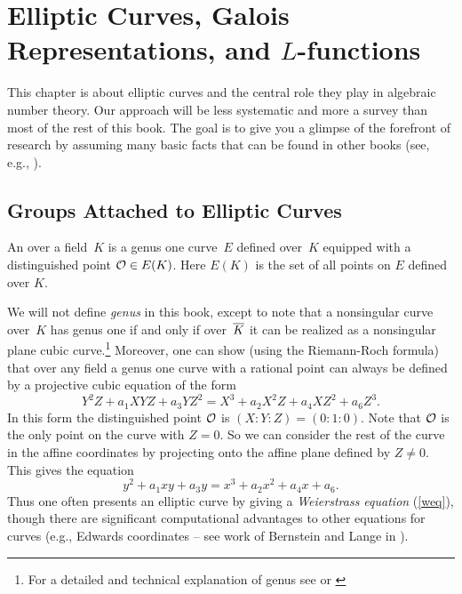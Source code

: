 \chapter[Elliptic Curves and $L$-functions]{Elliptic Curves, Galois Representations, and $L$-functions}

This chapter is about elliptic curves and the central role they play
in algebraic number theory.  Our approach will be less systematic and
more a survey than most of the rest of this book.  The goal is to
give you a glimpse of the forefront of research by assuming many basic
facts that can be found in other books (see, e.g.,
\cite{silverman:aec}).

\section{Groups Attached to Elliptic Curves}


\begin{definition}\label{defn:ec}
  An  over a field~$K$ is a genus one curve~$E$
  defined over~$K$ equipped with a distinguished point $\mathcal{O} \in E(K)$.
  Here $E(K)$ is the set of all points on $E$ defined over $K$.
\end{definition}
We will not define \emph{genus} in this book, except to note that a
nonsingular curve over~$K$ has genus one if and only if over~$\overline{K}$
it can be realized as a nonsingular plane cubic curve.\footnote{
	For a detailed and technical explanation of genus
	see \cite[Ch.~II.8]{hartshorne} or
	\cite[Ch.~7.3]{liu2006algebraic}
}
Moreover, one
can show (using the Riemann-Roch formula) that over any field a genus
one curve with a rational point can always be defined by a projective
cubic equation of the form
$$
  Y^2 Z + a_1 XYZ + a_3 YZ^2  = X^3  + a_2 X^2Z + a_4 XZ^2 + a_6 Z^3.
$$
In this form the distinguished point $\mathcal{O}$ is $(X:Y:Z) = (0:1:0)$.
Note that $\mathcal{O}$ is the only point on the curve with $Z=0$. So we
can consider the rest of the curve in the affine coordinates
by projecting onto the affine plane defined by $Z\neq 0$.
This gives the equation
\begin{equation}\label{weq}
  y^2 +a_1 xy + a_3 y = x^3 + a_2 x^2 + a_4 x + a_6.
\end{equation}
Thus one often presents an elliptic curve by giving a {\em Weierstrass
  equation} (\ref{weq}), though there are significant computational
advantages to other equations for curves (e.g., Edwards coordinates --
see work of Bernstein and Lange in \cite{bernstein2007inverted}).

